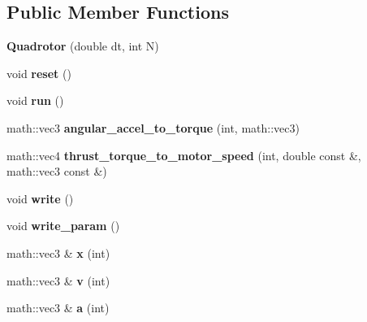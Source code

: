 \subsection*{\-Public \-Member \-Functions}
\begin{DoxyCompactItemize}
\item 
\hypertarget{classQuadrotor_a02a4b5c132d374626be48a5d288bb795}{{\bfseries \-Quadrotor} (double dt, int \-N)}\label{classQuadrotor_a02a4b5c132d374626be48a5d288bb795}

\item 
\hypertarget{classQuadrotor_a1e883a0d6205ad9af214afe2b6f84d2f}{void {\bfseries reset} ()}\label{classQuadrotor_a1e883a0d6205ad9af214afe2b6f84d2f}

\item 
\hypertarget{classQuadrotor_a86703e4d10af125e7b34ab09711c80f9}{void {\bfseries run} ()}\label{classQuadrotor_a86703e4d10af125e7b34ab09711c80f9}

\item 
\hypertarget{classQuadrotor_a32c9f06143c6b1ad7eff6442fae29b03}{math\-::vec3 {\bfseries angular\-\_\-accel\-\_\-to\-\_\-torque} (int, math\-::vec3)}\label{classQuadrotor_a32c9f06143c6b1ad7eff6442fae29b03}

\item 
\hypertarget{classQuadrotor_a5ab35934cf51134d5084ee58d9aa63fe}{math\-::vec4 {\bfseries thrust\-\_\-torque\-\_\-to\-\_\-motor\-\_\-speed} (int, double const \&, math\-::vec3 const \&)}\label{classQuadrotor_a5ab35934cf51134d5084ee58d9aa63fe}

\item 
\hypertarget{classQuadrotor_a1c250bf48c42d7fed0f1ebc74dbc7249}{void {\bfseries write} ()}\label{classQuadrotor_a1c250bf48c42d7fed0f1ebc74dbc7249}

\item 
\hypertarget{classQuadrotor_ae35477027bde2e9ad10ef7ac557000a8}{void {\bfseries write\-\_\-param} ()}\label{classQuadrotor_ae35477027bde2e9ad10ef7ac557000a8}

\item 
\hypertarget{classQuadrotor_a65d4670873c532d351a8d06f8c0c79b4}{math\-::vec3 \& {\bfseries x} (int)}\label{classQuadrotor_a65d4670873c532d351a8d06f8c0c79b4}

\item 
\hypertarget{classQuadrotor_aa6c1fd2c44edbb91f813bf0c19e89a80}{math\-::vec3 \& {\bfseries v} (int)}\label{classQuadrotor_aa6c1fd2c44edbb91f813bf0c19e89a80}

\item 
\hypertarget{classQuadrotor_a9b746718f4b7b89a8a764f716a319990}{math\-::vec3 \& {\bfseries a} (int)}\label{classQuadrotor_a9b746718f4b7b89a8a764f716a319990}


\end{DoxyCompactItemize}
